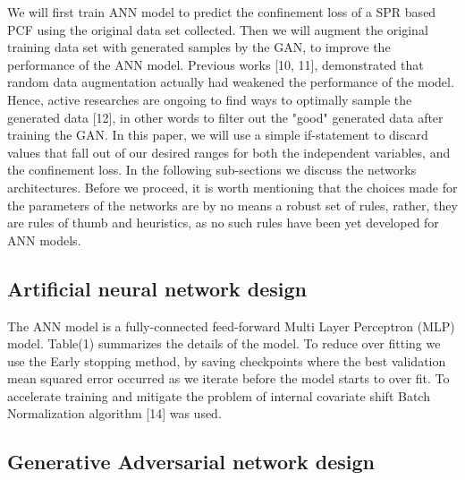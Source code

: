 \documentclass[draft, a4, 10pt, onecolumn]{IEEEtran}
\begin{document}
We will first train ANN model to predict the confinement loss of a SPR based PCF using the original data set collected. Then we will augment the original training data set with generated samples by the GAN, to improve the performance of the ANN model.
Previous works [10, 11], demonstrated that random data augmentation actually had weakened the performance of the model. Hence, active researches are ongoing to find ways to optimally sample the generated data [12], in other words to filter out the "good" generated data after training the GAN. In this paper, we will use a simple if-statement to discard values that fall out of our desired ranges for both the independent variables, and the confinement loss. In the following sub-sections we discuss the networks architectures. Before we proceed, it is worth mentioning that the choices made for the parameters of the networks are by no means a robust set of rules, rather, they are rules of thumb and heuristics, as no such rules have been yet developed for ANN models.

\subsection{Artificial neural network design}
\label{ssec:ann}
The ANN model is a fully-connected feed-forward Multi Layer Perceptron (MLP) model. Table(1) summarizes the details of the model. To reduce over fitting we use the Early stopping method, by saving checkpoints where the best validation mean squared error occurred as we iterate before the model starts to over fit. To accelerate training and mitigate the problem of internal covariate shift Batch Normalization algorithm [14] was used.

\begin{table}[h]
\centering
{}
\caption{Detailes of the ANN model}
\end{table}

\subsection{Generative Adversarial network design}
\label{ssec:gan}
\end{document}
